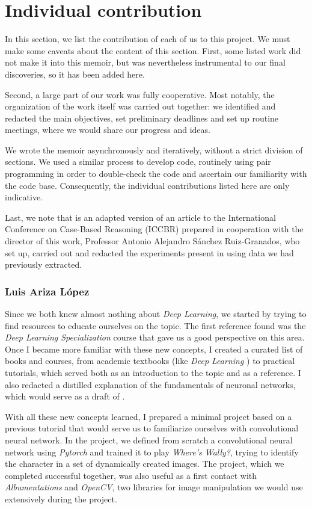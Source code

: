 \chapter*{Individual contribution}
In this section, we list the contribution of each of us to this project. We must make some caveats about the content of this section. First, some listed work did not make it into this memoir, but was nevertheless instrumental to our final discoveries, so it has been added here. 

Second, a large part of our work was fully cooperative. Most notably, the organization of the work itself was carried out together: we identified and redacted the main objectives, set preliminary deadlines and set up routine meetings, where we would share our progress and ideas.

We wrote the memoir asynchronously and iteratively, without a strict division of sections.  We used a similar process to develop code, routinely using pair programming in order to double-check the code and ascertain our familiarity with the code base. Consequently, the individual contributions listed here are only indicative. 

Last, we note that  is an adapted version of an article to the International Conference on Case-Based Reasoning (ICCBR) prepared in cooperation with the director of this work, Professor Antonio Alejandro Sánchez Ruiz-Granados, who set up, carried out and redacted the experiments present in  using data we had previously extracted. 

\subsection*{Luis Ariza López}
Since we both knew almost nothing about \textit{Deep Learning}, we started by trying to find resources to educate ourselves on the topic. The first reference found was the \textit{Deep Learning Specialization} \cite{andrewNg} course that gave us a good perspective on this area. Once I became more familiar with these new concepts, I created a curated list of books and courses, from academic textbooks (like \textit{Deep Learning} \cite{goodfellow2016deep}) to practical tutorials, which served both as an introduction to the topic and as a reference. I also redacted a distilled explanation of the fundamentals of neuronal networks, which would serve as a draft of . 

With all these new concepts learned, I prepared a minimal project based on a previous tutorial \cite{whereWaldo} that would serve us to familiarize ourselves with convolutional neural network. In the project, we defined from scratch a convolutional neural network using \textit{Pytorch} and trained it to play \textit{Where's Wally?}, trying to identify the character in a set of dynamically created images. The project, which we completed successful together, was also useful as a first contact with \textit{Albumentations} and \textit{OpenCV}, two libraries for image manipulation we would use extensively during the project.


